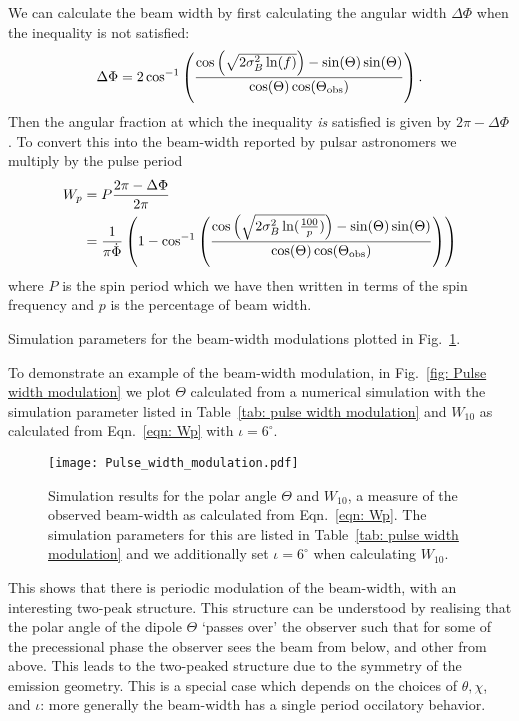 \documentclass[../full_thesis/full_thesis.tex]{subfiles}
\begin{document}
We can calculate the beam width by first calculating the angular width $\Delta\Phi$
when the inequality is not satisfied:
\begin{equation}
    \Delta\Phi = 2\cos^{-1}\left(
                \frac{\cos\left(\sqrt{2\sigma_{B}^{2} \ln(f)}\right) - \sin(\Theta)\sin(\Theta)}
                          {\cos(\Theta)\cos(\Theta_{\mathrm{obs}})}
                      \right).
\end{equation}
Then the angular fraction at which the inequality \emph{is} satisfied is given by
$2\pi - \Delta\Phi$. To convert this into the beam-width reported by pulsar
astronomers we multiply by the pulse period
\begin{align}
    W_{p} & = P \frac{2\pi - \Delta\Phi}{2\pi}\\
          & = \frac{1}{\pi \dot{\Phi}}\left(1 -
               \cos^{-1}\left(
                   \frac{\cos\left(\sqrt{2\sigma_{B}^{2} \ln(\frac{100}{p})}\right) - \sin(\Theta)\sin(\Theta)}
                          {\cos(\Theta)\cos(\Theta_{\mathrm{obs}})}
                      \right)
                  \right)
\label{eqn: Wp}
\end{align}
where $P$ is the spin period which we have then written in terms of the spin
frequency and $p$ is the percentage of beam width.

\begin{table}[htb]
\centering

\caption{Simulation parameters for the beam-width modulations plotted in
Fig.~\ref{fig: Pulse width modulation}.}
\label{tab: pulse width modulation}
\end{table}
To demonstrate an example of the beam-width modulation, in Fig.~\ref{fig: Pulse width
modulation} we plot $\Theta$ calculated from a numerical simulation with the
simulation parameter listed in Table~\ref{tab: pulse width modulation} and
$W_{10}$ as calculated from Eqn.~\eqref{eqn: Wp} with $\iota=6^{\circ}$.
\begin{figure}[ht]
\centering
\texttt{[image: Pulse\_width\_modulation.pdf]}
\caption{Simulation results for the polar angle $\Theta$ and $W_{10}$, a
measure of the observed beam-width as calculated from Eqn.~\eqref{eqn: Wp}.
The simulation parameters for this are listed in Table~\ref{tab: pulse width modulation}
and we additionally set $\iota=6^{\circ}$ when calculating $W_{10}$.}
\label{fig: Pulse width modulation}
\end{figure}
This shows that there is periodic modulation of the beam-width, with an
interesting two-peak structure. This structure can be understood by realising
that the polar angle of the dipole $\Theta$ `passes over' the observer such
that for some of the precessional phase the observer sees the beam from below,
and other from above. This leads to the two-peaked structure due to the
symmetry of the emission geometry. This is a special case which depends on
the choices of $\theta, \chi$, and $\iota$: more generally the beam-width has
a single period occilatory behavior.
\end{document}
